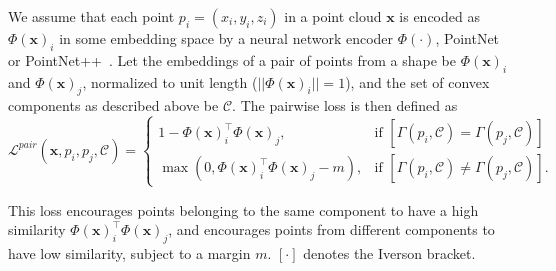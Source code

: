 We assume that each point $p_i = (x_i, y_i, z_i)$ in a point cloud $\mathbf{x}$ is encoded as 
$\Phi(\mathbf{x})_i$ in some embedding space by a neural network encoder $\Phi(\cdot)$, 
\eg PointNet~\cite{pointnet} or PointNet++~\cite{qi2017pointnetpp}. 
Let the embeddings of a pair of points from a shape be $\Phi(\mathbf{x})_i$ and $\Phi(\mathbf{x})_j$, 
normalized to unit length (\ie $|| \Phi(\mathbf{x})_i|| = 1$), and the set of convex components as 
described above be $\mathcal{C}$.
The pairwise loss is then defined as 
\begin{equation}
    \mathcal{L}^{pair}(\mathbf{x}, p_i, p_j, \mathcal{C}) =
        \begin{cases}
        1 -   \Phi(\mathbf{x})_i^\top \Phi(\mathbf{x})_j, & \text{if }  [\Gamma(p_i, \mathcal{C}) = \Gamma(p_j, \mathcal{C})]  \\
        \max(0, \Phi(\mathbf{x})_i^\top \Phi(\mathbf{x})_j - m), & \text{if } [\Gamma(p_i, \mathcal{C}) \neq \Gamma(p_j, \mathcal{C})].
        \end{cases}
    \label{eq:pairwise}
\end{equation}

This loss encourages
points belonging to the same component to have a high similarity $ \Phi(\mathbf{x})_i^\top \Phi(\mathbf{x})_j$,
and encourages points from different components to have low similarity, subject to a margin $m$.
$[\cdot]$ denotes the Iverson bracket. 


